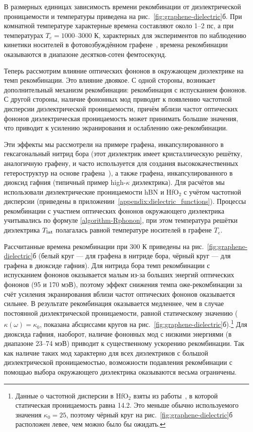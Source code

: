 В размерных единицах зависимость времени рекомбинации от диэлектрической проницаемости и температуры приведена на рис.~\ref{fig:graphene-dielectric}б. При комнатной температуре характерные времена составляют около 1--2 пс, а при температурах $T_e = 1000$--3000 К, характерных для экспериментов по наблюдению кинетики носителей в фотовозбуждённом графене~\cite{Gierz2013,Gierz2014,Gierz2015,Gierz2016}, времена рекомбинации оказываются в диапазоне десятков-сотен фемтосекунд.

Теперь рассмотрим влияние оптических фононов в окружающем диэлектрике на темп рекомбинации. Это влияние двоякое. С одной стороны, возникает дополнительный механизм рекомбинации: рекомбинация с испусканием фононов. С другой стороны, наличие фононных мод приводит к появлению частотной дисперсии диэлектрической проницаемости, причём вблизи частот оптических фононов диэлектрическая проницаемость может принимать большие значения, что приводит к усилению экранирования и ослаблению оже-рекомбинации.

Эти эффекты мы рассмотрели на примере графена, инкапсулированного в гексагональный нитрид бора (этот диэлектрик имеет кристаллическую решётку, аналогичную графену, и часто используется для создания высококачественных гетероструктур на основе графена~\cite{high-quality_graphene}), а также графена, инкапсулированного в диоксид гафния (типичный пример high-$\kappa$ диэлектрика). Для расчётов мы использовали диэлектрические проницаемости hBN и HfO$_2$ с учётом частотной дисперсии (приведены в приложении~\ref{appendix:dielectric_functions}). Процессы рекомбинации с участием оптических фононов окружающего диэлектрика учитывались по формуле \eqref{algorithm-Rphonon}, при этом температура решётки диэлектрика $T_{\rm lat}$ полагалась равной температуре носителей в графене $T_e$.

Рассчитанные времена рекомбинации при 300 К приведены на рис.~\ref{fig:graphene-dielectric}б (белый круг --- для графена в нитриде бора, чёрный круг --- для графена в диоксиде гафния). Для нитрида бора темп рекомбинации с испусканием фононов оказывается малым из-за больших энергий оптических фононов (95 и 170 мэВ), поэтому эффект снижения темпа оже-рекомбинации за счёт усиления экранирования вблизи частот оптических фононов оказывается сильнее. В результате рекомбинация оказывается медленнее, чем в случае постоянной диэлектрической проницаемости, равной статическому значению ($\kappa(\omega) = \kappa_0$, показана абсциссами кругов на рис.~\ref{fig:graphene-dielectric}б).\footnote{Данные о частотной дисперсии в HfO$_2$ взяты из работы~\cite{HfO2kappa}, в которой статическая проницаемость равна 14.2. Это меньше обычно используемого значения $\kappa_0 = 25$, поэтому чёрный круг на рис.~\ref{fig:graphene-dielectric}б расположен левее, чем можно было бы ожидать.} Для диоксида гафния, наоборот, наличие фононных мод с низкими энергиями (в диапазоне 23--74 мэВ) приводит к существенному ускорению рекомбинации. Так как наличие таких мод характерно для всех диэлектриков с большой диэлектрической проницаемостью, возможности подавления рекомбинации с помощью выбора окружающего диэлектрика оказываются весьма ограничены.

